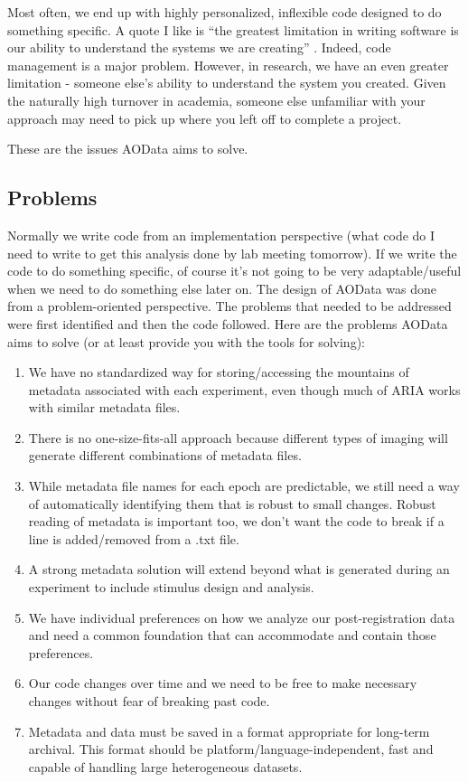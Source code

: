 \documentclass[10pt]{exam}
\begin{document}
		Most often, we end up with highly personalized, inflexible code designed to do something specific. A quote I like is ``the greatest limitation in writing software is our ability to understand the systems we are creating'' \cite{Osterhout2018}. Indeed, code management is a major problem. However, in research, we have an even greater limitation - someone else's ability to understand the system you created. Given the naturally high turnover in academia, someone else unfamiliar with your approach may need to pick up where you left off to complete a project. %
		
		These are the issues AOData aims to solve. 
	
	\subsection{Problems}	
		\noindent Normally we write code from an implementation perspective (what code do I need to write to get this analysis done by lab meeting tomorrow). If we write the code to do something specific, of course it's not going to be very adaptable/useful when we need to do something else later on. The design of AOData was done from a problem-oriented perspective. The problems that needed to be addressed were first identified and then the code followed. Here are the problems AOData aims to solve (or at least provide you with the tools for solving): 
		\begin{enumerate}
			\item We have no standardized way for storing/accessing the mountains of metadata associated with each experiment, even though much of ARIA works with similar metadata files. %
			\item There is no one-size-fits-all approach because different types of imaging will generate different combinations of metadata files. %
			\item While metadata file names for each epoch are predictable, we still need a way of automatically identifying them that is robust to small changes. Robust reading of metadata is important too, we don't want the code to break if a line is added/removed from a .txt file.
			\item A strong metadata solution will extend beyond what is generated during an experiment to include stimulus design and analysis. 
			\item We have individual preferences on how we analyze our post-registration data and need a common foundation that can accommodate and contain those preferences.
			\item Our code changes over time and we need to be free to make necessary changes without fear of breaking past code. %
			\item Metadata and data must be saved in a format appropriate for long-term archival. This format should be platform/language-independent, fast and capable of handling large heterogeneous datasets. %
		\end{enumerate}
		
\end{document}
